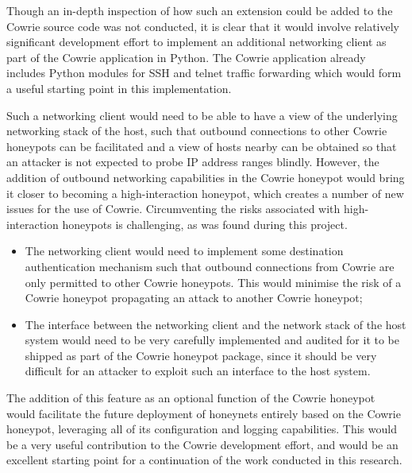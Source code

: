 Though an in-depth inspection of how such an extension could be added to the Cowrie source code was not conducted, it is clear that it would involve relatively significant development effort to implement an additional networking client as part of the Cowrie application in Python. The Cowrie application already includes Python modules for SSH and telnet traffic forwarding which would form a useful starting point in this implementation.

Such a networking client would need to be able to have a view of the underlying networking stack of the host, such that outbound connections to other Cowrie honeypots can be facilitated and a view of hosts nearby can be obtained so that an attacker is not expected to probe IP address ranges blindly. However, the addition of outbound networking capabilities in the Cowrie honeypot would bring it closer to becoming a high-interaction honeypot, which creates a number of new issues for the use of Cowrie. Circumventing the risks associated with high-interaction honeypots is challenging, as was found during this project.
\begin{itemize}
\item The networking client would need to implement some destination authentication mechanism such that outbound connections from Cowrie are only permitted to other Cowrie honeypots. This would minimise the risk of a Cowrie honeypot propagating an attack to another Cowrie honeypot;
\item The interface between the networking client and the network stack of the host system would need to be very carefully implemented and audited for it to be shipped as part of the Cowrie honeypot package, since it should be very difficult for an attacker to exploit such an interface to the host system.
\end{itemize}

The addition of this feature as an optional function of the Cowrie honeypot would facilitate the future deployment of honeynets entirely based on the Cowrie honeypot, leveraging all of its configuration and logging capabilities. This would be a very useful contribution to the Cowrie development effort, and would be an excellent starting point for a continuation of the work conducted in this research.



